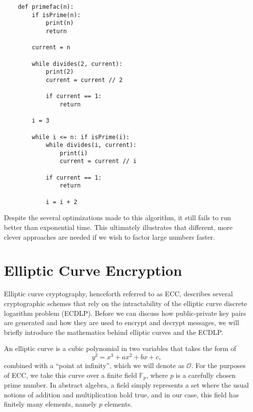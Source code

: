 \documentclass[letterpaper,twocolumn,12pt]{article}
\begin{document}
    \begin{verbatim}
    def primefac(n):
        if isPrime(n):
            print(n)
            return

        current = n

        while divides(2, current):
            print(2)
            current = current // 2

            if current == 1:
                return
        
        i = 3

        while i <= n: if isPrime(i):
            while divides(i, current):
                print(i)
                current = current // i

            if current == 1:
                return

            i = i + 2
    \end{verbatim}

    Despite the several optimizations made to this algorithm, it still fails to
    run better than exponential time. This ultimately illustrates that
    different, more clever approaches are needed if we wish to factor large
    numbers faster.

    \section*{Elliptic Curve Encryption}

    Elliptic curve cryptography, henceforth referred to as ECC, describes
    several cryptographic schemes that rely on the intractability of the
    elliptic curve discrete logarithm problem (ECDLP).
    Before we can discuss how public-private key pairs are generated and how
    they are used to encrypt and decrypt messages, we will briefly introduce
    the mathematics behind elliptic curves and the ECDLP.
    
    An elliptic curve is a cubic polynomial in two variables that takes the
    form of
    \[ y^2 = x^3 + ax^2 + bx + c, \]
    combined with a ``point at infinity'', which we will denote as
    \( \mathcal{O} \).
    For the purposes of ECC, we take this curve over a finite field
    \( \mathbb{F}_p \), where \( p \) is a carefully chosen prime number.
    In abstract algebra, a field simply represents a set where the usual
    notions of addition and multiplication hold true, and in our case, this
    field has finitely many elements, namely \( p \) elements.
\end{document}
